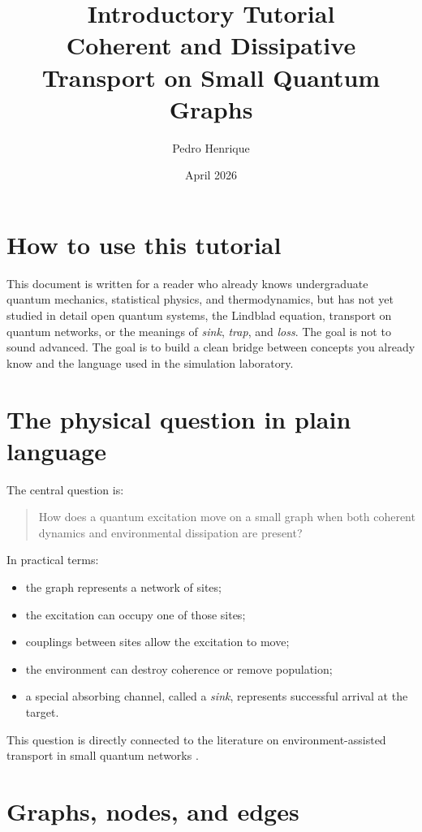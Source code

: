 \documentclass[11pt,a4paper]{article}
\title{\textbf{Introductory Tutorial}\\
\large Coherent and Dissipative Transport on Small Quantum Graphs}
\author{Pedro Henrique}
\date{April 2026}
\begin{document}
\maketitle
\tableofcontents
\newpage

\section{How to use this tutorial}

This document is written for a reader who already knows undergraduate quantum
mechanics, statistical physics, and thermodynamics, but has not yet studied in
detail open quantum systems, the Lindblad equation, transport on quantum
networks, or the meanings of \emph{sink}, \emph{trap}, and \emph{loss}. The
goal is not to sound advanced. The goal is to build a clean bridge between
concepts you already know and the language used in the simulation laboratory.

\section{The physical question in plain language}

The central question is:
\begin{quote}
How does a quantum excitation move on a small graph when both coherent dynamics
and environmental dissipation are present?
\end{quote}

In practical terms:
\begin{itemize}
  \item the graph represents a network of sites;
  \item the excitation can occupy one of those sites;
  \item couplings between sites allow the excitation to move;
  \item the environment can destroy coherence or remove population;
  \item a special absorbing channel, called a \emph{sink}, represents successful arrival at the target.
\end{itemize}

This question is directly connected to the literature on environment-assisted
transport in small quantum networks \citep{mohseni_2008, plenio_huelga_2008,
rebentrost_2009, caruso_2009}.

\section{Graphs, nodes, and edges}
\end{document}
